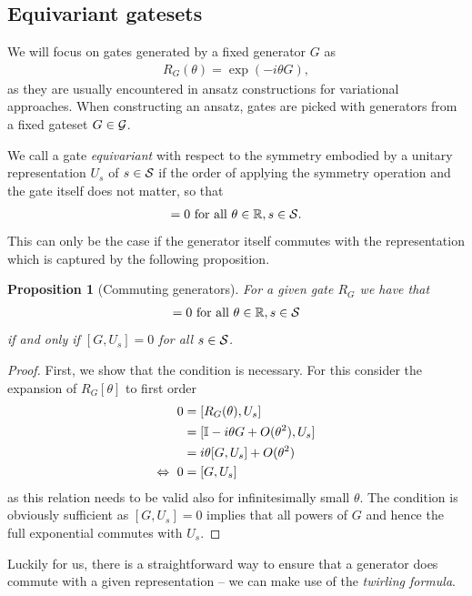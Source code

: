 \documentclass[a4paper,twocolumn,notitlepage,nofootinbib,superscriptaddress,floatfix]{revtex4-2}
\newtheorem{proposition}[theorem]{Proposition}
\begin{document}
\subsection*{Equivariant gatesets}

We will focus on gates generated by a fixed generator $G$ as
\begin{align}\label{eqn:parametrized_gate_def}
    R_G(\theta) = \exp( -i \theta G),
\end{align}
as they are usually encountered in ansatz constructions for variational approaches. When constructing an ansatz, gates are picked with generators from a fixed gateset $G \in \mathcal{G}$. 

We call a gate \emph{equivariant} with respect to the symmetry embodied by a unitary representation $U_s$ of $s\in \mathcal{S}$ if the order of applying the symmetry operation and the gate itself does not matter, so that
\begin{align}
    [R_G(\theta), U_s] = 0 \text{ for all } \theta \in \bbR, s \in \calS.
\end{align}
This can only be the case if the generator itself commutes with the representation which is captured by the following proposition.

\begin{proposition}[Commuting generators]
For a given gate $R_G$ we have that
\begin{align}
    [R_G(\theta), U_s] = 0 \text{ for all } \theta \in \bbR, s \in \calS
\end{align}
if and only if $[G, U_s] = 0$ for all $s \in \mathcal{S}$.
\end{proposition}
\begin{proof}
First, we show that the condition is necessary. For this consider the expansion of $R_G[\theta]$ to first order
\begin{align}
    0 &= [R_G(\theta), U_s] \\
    &= [\mathbb{I} - i  \theta G +  O(\theta^2), U_s] \\
    &= i  \theta [G, U_s] + O( \theta^2) \\
    \Leftrightarrow \ 0 &= [G, U_s]
\end{align}
as this relation needs to be valid also for infinitesimally small $\theta$. The condition is obviously sufficient as $[G, U_s] = 0$ implies that all powers of $G$ and hence the full exponential commutes with $U_s$.
\end{proof}

Luckily for us, there is a straightforward way to ensure that a generator does commute with a given representation -- we can make use of the \emph{twirling formula}.
\end{document}
